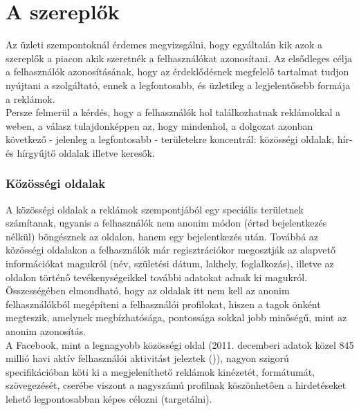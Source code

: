 \section{A szereplők} %
\label{sec:a_szereplők}

Az üzleti szempontoknál érdemes megvizsgálni, hogy egyáltalán kik azok a szereplők a piacon akik szeretnék a felhasználókat azonosítani. Az elsődleges célja a felhasználók azonosításának, hogy az érdeklődésnek megfelelő tartalmat tudjon nyújtani a szolgáltató, ennek a legfontosabb, és üzletileg a legjelentősebb formája a reklámok.\hfill\\

Persze felmerül a kérdés, hogy a felhasználók hol találkozhatnak reklámokkal a weben, a válasz tulajdonképpen az, hogy mindenhol, a dolgozat azonban következő - jelenleg a legfontosabb - területekre koncentrál: közösségi oldalak, hír- és hírgyűjtő oldalak illetve keresők.

\subsubsection{Közösségi oldalak} %
\label{ssub:közösségi_oldalak}

A közösségi oldalak a reklámok szempontjából egy speciális területnek számítanak, ugyanis a felhasználók nem anonim módon (értsd bejelentkezés nélkül) böngésznek az oldalon, hanem egy bejelentkezés után. Továbbá az közösségi oldalakon a felhasználók már regisztrációkor megosztják az alapvető információkat magukról (név, születési dátum, lakhely, foglalkozás), illetve az oldalon történő tevékenységeikkel további adatokat adnak ki magukról. Összességében elmondható, hogy az oldalak itt nem kell az anonim felhasználókból megépíteni a felhasználói profilokat, hiszen a tagok önként megteszik, amelynek megbízhatósága, pontossága sokkal jobb minőségű, mint az anonim azonosítás.\hfill\\

A Facebook, mint a legnagyobb közösségi oldal (2011. decemberi adatok közel 845 millió havi aktív felhasználói aktivitást jeleztek (\cite{fb_stat})), nagyon szigorú specifikációban köti ki a megjeleníthető reklámok kinézetét, formátumát, szövegezését, cserébe viszont a nagyszámú profilnak köszönhetően a hirdetéseket lehető legpontosabban képes célozni (targetálni). \cite{thinkdigital_fb}


